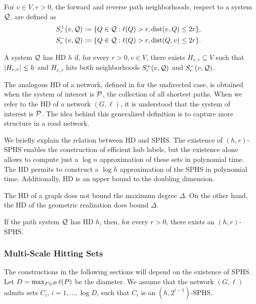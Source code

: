 \begin{definition}
For $v\in V, r>0$, the forward and reverse path neighborhoods, respect to a system $\mathcal{Q}$, are defined as 
\begin{align*}
S_r^+(v,\mathcal{Q}) &:=\{Q\in\mathcal{Q}:\ell(Q)>r,  \text{dist}(v,Q)\leq 2r \}, \\  
S_r^-(v,\mathcal{Q}) &:=\{Q\in\mathcal{Q}:\ell(Q)>r,  \text{dist}(Q,v)\leq 2r \}.
\end{align*}
\end{definition}

\begin{definition}
A system $\mathcal{Q}$ has HD $h$ if, for every $r>0, v\in V$, there exists $H_{v,r}\subseteq V$ such that $\lvert H_{v,r}\rvert\leq h$ and $H_{v,r}$ hits both neighborhoods $S_r^+(v,\mathcal{Q})$ and $S_r^-(v,\mathcal{Q})$.
\end{definition}

The analogous HD of a network, defined in \citet{highway2013} for the undirected case, is obtained when the system of interest is $\mathcal{P}$, the collection of all shortest paths.
When we refer to the HD of a network $(G,\ell)$, it is understood that the system of interest is $\mathcal{P}$.
The idea behind this generalized definition is to capture more structure in a road network.

We briefly explain the relation between HD and SPHS.
The existence of $(h,r)$-SPHS enables the construction of efficient hub labels, but the existence alone allows to compute just a $\log n$ approximation of these sets in polynomial time.
The HD permits to construct a $\log h$ approximation of the SPHS in polynomial time.
Additionally, HD is an upper bound to the doubling dimension.

The HD of a graph does not bound the maximum degree $\Delta$.
On the other hand, the HD of the geometric realization does bound $\Delta$.

\begin{proposition}
If the path system $\mathcal{Q}$ has HD $h$, then, for every $r>0$, there exists an $(h,r)$-SPHS.
\end{proposition}

\subsubsection{Multi-Scale Hitting Sets} \label{sec:multi_scale}
The constructions in the following sections will depend on the existence of SPHS.
Let $D=\max_{P\in\mathcal{P}}\ell(P)$ be the diameter.
We assume that the network $(G,\ell)$ admits sets $C_i$, $i=1,\ldots,\log D$, such that $C_i$ is an $(h,2^{i-1})$-SPHS.

